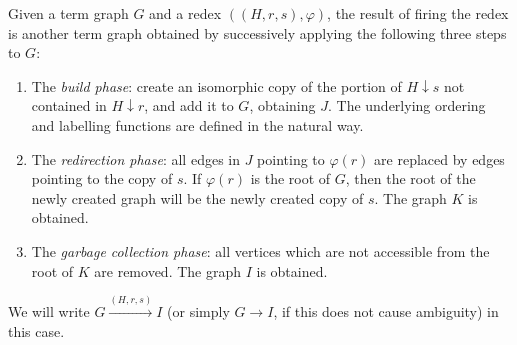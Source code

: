 \documentclass{LMCS}
\newcommand{\rootone}{r}
\newcommand{\roottwo}{s}
\newcommand{\tgone}{G}
\newcommand{\tgtwo}{H}
\newcommand{\tgthree}{J}
\newcommand{\tgfour}{K}
\newcommand{\tgfive}{I}
\newcommand{\homone}{\varphi}
\newcommand{\rewrite}[1]{\stackrel{#1}{\longrightarrow}}
\newcommand{\rewrgraph}{\rightarrow}
\newcommand{\subgr}[2]{#1\downarrow #2}
\begin{document}
Given a term graph $\tgone$ and a redex $((\tgtwo,\rootone,\roottwo),\homone)$,
the result of firing the redex is another term graph obtained by
successively applying the following three steps to $\tgone$:
\begin{enumerate}[1.]
\item
  The \emph{build phase}: create an isomorphic copy of the portion of
  $\subgr{\tgtwo}{\roottwo}$ not contained in
  $\subgr{\tgtwo}{\rootone}$, and add it to $\tgone$, obtaining $\tgthree$.
  The underlying ordering and labelling functions are defined in the natural
  way.
\item
  The \emph{redirection phase}: all edges in $\tgthree$ pointing to $\homone(\rootone)$
  are replaced by edges pointing to the copy of $\roottwo$. If $\homone(\rootone)$
  is the root of $\tgone$, then the root of the newly created graph will be
  the newly created copy of $\roottwo$. The graph $\tgfour$ is obtained.
\item
  The \emph{garbage collection phase}: all vertices which are not accessible
  from the root of $\tgfour$ are removed. The graph $\tgfive$ is obtained.
\end{enumerate}
We will write $\tgone\rewrite{(\tgtwo,\rootone,\roottwo)}\tgfive$ (or simply
$\tgone\rewrgraph\tgfive$, if this does not cause ambiguity) in this case.
\end{document}
